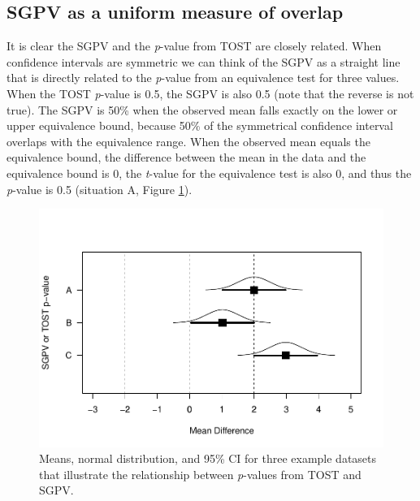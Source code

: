 \documentclass[floatsintext,man]{apa6}
\theoremstyle{definition}
\theoremstyle{definition}
\theoremstyle{definition}
\theoremstyle{remark}
\begin{document}
\subsection{SGPV as a uniform measure of
overlap}\label{sgpv-as-a-uniform-measure-of-overlap}

It is clear the SGPV and the \emph{p}-value from TOST are closely
related. When confidence intervals are symmetric we can think of the
SGPV as a straight line that is directly related to the \emph{p}-value
from an equivalence test for three values. When the TOST \emph{p}-value
is 0.5, the SGPV is also 0.5 (note that the reverse is not true). The
SGPV is 50\% when the observed mean falls exactly on the lower or upper
equivalence bound, because 50\% of the symmetrical confidence interval
overlaps with the equivalence range. When the observed mean equals the
equivalence bound, the difference between the mean in the data and the
equivalence bound is 0, the \emph{t}-value for the equivalence test is
also 0, and thus the \emph{p}-value is 0.5 (situation A, Figure
\ref{fig:TOSTSGPV3}).

\begin{figure}
\centering
\includegraphics{manuscript_files/figure-latex/TOSTSGPV3-1.pdf}
\caption{\label{fig:TOSTSGPV3}Means, normal distribution, and 95\% CI for
three example datasets that illustrate the relationship between
\emph{p}-values from TOST and SGPV.}
\end{figure}
\end{document}
